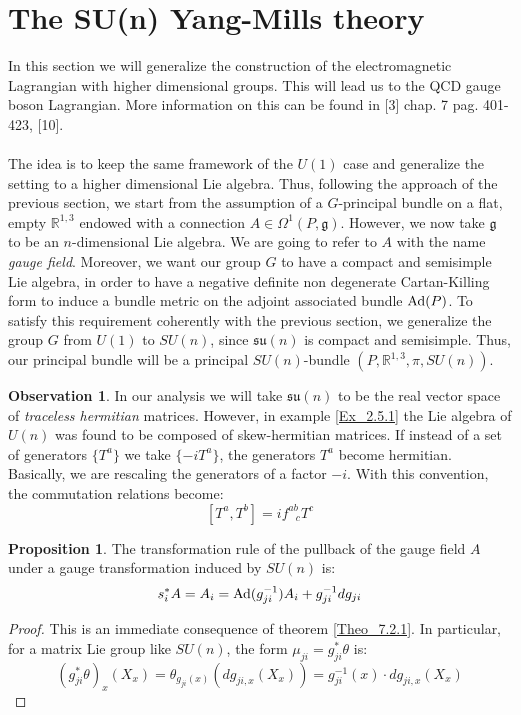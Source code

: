 \documentclass[12pt,a4paper]{report}
\theoremstyle{definition}
\theoremstyle{Theorem}
\newtheorem{Prop}[Def]{Proposition}
\theoremstyle{definition}
\theoremstyle{definition}
\newtheorem{Obs}[Def]{Observation}
\begin{document}
	\section{The SU(n) Yang-Mills theory}
	In this section we will generalize the construction of the electromagnetic Lagrangian with higher dimensional groups. This will lead us to the QCD gauge boson Lagrangian. More information on this can be found in [3] chap. 7 pag. 401-423, [10].
	\\\\
	The idea is to keep the same framework of the $U(1)$ case and generalize the setting to a higher dimensional Lie algebra. Thus, following the approach of the previous section, we start from the assumption of a $G$-principal bundle on a flat, empty $\mathbb{R}^{1,3}$ endowed with a connection $A\in \Omega^1(P,\mathfrak{g})$. However, we now take $\mathfrak{g}$ to be an $n$-dimensional Lie algebra. We are going to refer to $A$ with the name \textit{gauge field}. Moreover, we want our group $G$ to have a compact and semisimple Lie algebra, in order to have a negative definite non degenerate Cartan-Killing form to induce a bundle metric on the adjoint associated bundle $\hbox{Ad}(P)$. To satisfy this requirement coherently with the previous section, we generalize the group $G$ from $U(1)$ to $SU(n)$, since $\mathfrak{su}(n)$ is compact and semisimple. Thus, our principal bundle will be a principal $SU(n)$-bundle $(P,\mathbb{R}^{1,3},\pi,SU(n))$.
	\begin{Obs}
		In our analysis we will take $\mathfrak{su}(n)$ to be the real vector space of \textit{traceless hermitian} matrices. However, in example \ref{Ex_2.5.1} the Lie algebra of $U(n)$ was found to be composed of skew-hermitian matrices. If instead of a set of generators $\{T^a\}$ we take $\{-iT^a\}$, the generators $T^a$ become hermitian. Basically, we are rescaling the generators of a factor $-i$.
		With this convention, the commutation relations become:
		$$[T^a,T^b]=if^{ab}_{\hspace{9pt}c}T^c$$
	\end{Obs}
	\begin{Prop}
		The transformation rule of the pullback of the gauge field $A$ under a gauge transformation induced by $SU(n)$ is:
		$$s_i^*A=A_i=\hbox{Ad}(g_{ji}^{-1})A_i+g^{-1}_{ji}dg_{ji}$$ 
	\end{Prop}
	\begin{proof}
		This is an immediate consequence of theorem \ref{Theo_7.2.1}. In particular, for a matrix Lie group like $SU(n)$, the form $\mu_{ji}=g_{ji}^*\theta$ is:
		$$(g_{ji}^*\theta)_x(X_x)=\theta_{g_{ji}(x)}(dg_{ji,x}(X_x))=g^{-1}_{ji}(x)\cdot dg_{ji,x}(X_x)$$
	\end{proof}
\end{document}
